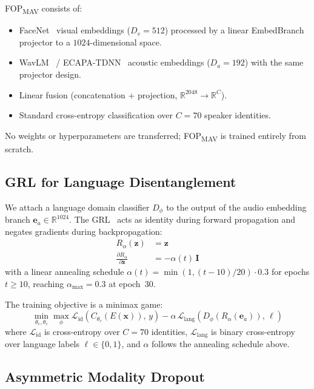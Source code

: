 \documentclass[conference]{IEEEtran}
\newcommand{\fopmav}{FOP\textsubscript{MAV}}
\begin{document}
\fopmav{} consists of:
\begin{itemize}
  \item FaceNet~\cite{schroff2015facenet} visual embeddings ($D_v = 512$) processed
  by a linear EmbedBranch projector to a $1024$-dimensional space.
  \item WavLM~\cite{chen2020wavlm} / ECAPA-TDNN~\cite{desplanques2020ecapa}
  acoustic embeddings ($D_a = 192$) with the same projector design.
  \item Linear fusion (concatenation + projection, $\mathbb{R}^{2048} \to \mathbb{R}^{C}$).
  \item Standard cross-entropy classification over $C = 70$ speaker identities.
\end{itemize}

No weights or hyperparameters are transferred; \fopmav{} is trained entirely from scratch.

\subsection{GRL for Language Disentanglement}

We attach a language domain classifier $D_\phi$ to the output of the audio
embedding branch $\mathbf{e}_a \in \mathbb{R}^{1024}$.
The GRL~\cite{ganin2016domain} acts as identity during forward propagation and
negates gradients during backpropagation:
\begin{align}
R_\alpha(\mathbf{z}) &= \mathbf{z} \label{eq:grl_fwd} \\
\frac{\partial R_\alpha}{\partial \mathbf{z}} &= -\alpha(t)\,\mathbf{I}
\label{eq:grl_bwd}
\end{align}
with a linear annealing schedule $\alpha(t) = \min(1, (t-10)/20) \cdot 0.3$
for epochs $t \geq 10$, reaching $\alpha_{\max}=0.3$ at epoch~30.

The training objective is a minimax game:
\begin{equation}
\min_{\theta_e,\theta_c}\max_{\phi}
  \mathcal{L}_{\text{id}}\!\left(C_{\theta_c}(E(\mathbf{x})),\,y\right)
  - \alpha\,\mathcal{L}_{\text{lang}}\!\left(D_\phi(R_\alpha(\mathbf{e}_a)),\,\ell\right)
\label{eq:minimax}
\end{equation}
where $\mathcal{L}_{\text{id}}$ is cross-entropy over $C = 70$ identities,
$\mathcal{L}_{\text{lang}}$ is binary cross-entropy over language labels
$\ell \in \{0,1\}$, and $\alpha$ follows the annealing schedule above.

\subsection{Asymmetric Modality Dropout}
\end{document}

